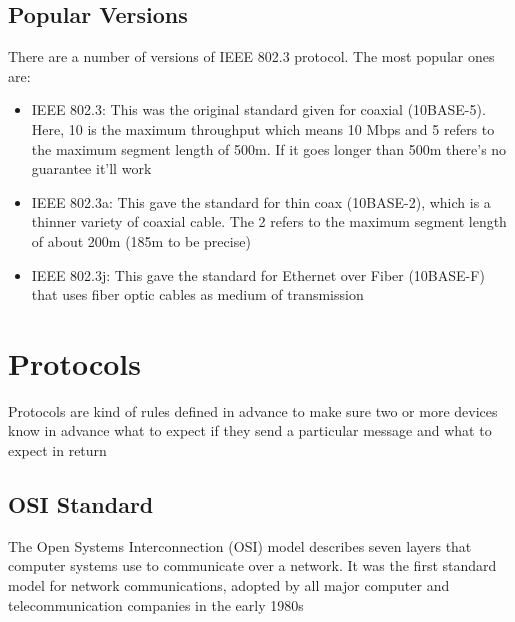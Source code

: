 \documentclass[a4paper,12pt]{article}
\begin{document}
\subsection{Popular Versions}

There are a number of versions of IEEE 802.3 protocol. The most popular ones are:



\begin{itemize}
\item{IEEE 802.3: This was the original standard given for coaxial (10BASE-5). Here, 10 is the maximum throughput which means 10 Mbps and 5 refers to the maximum segment length of 500m. If it goes longer than 500m there's no guarantee it'll work}
\item{IEEE 802.3a: This gave the standard for thin coax (10BASE-2), which is a thinner variety of coaxial cable. The 2 refers to the maximum segment length of about 200m (185m to be precise)}
\item{IEEE 802.3j: This gave the standard for Ethernet over Fiber (10BASE-F) that uses fiber optic cables as medium of transmission}
\end{itemize}

\clearpage

\section{Protocols}

Protocols are kind of rules defined in advance to make sure two or more devices know in advance what to expect if they send a particular message and what to expect in return 

\subsection{OSI Standard}
The Open Systems Interconnection (OSI) model describes seven layers that computer systems use to communicate over a network. It was the first standard model for network communications, adopted by all major computer and telecommunication companies in the early 1980s
\end{document}
